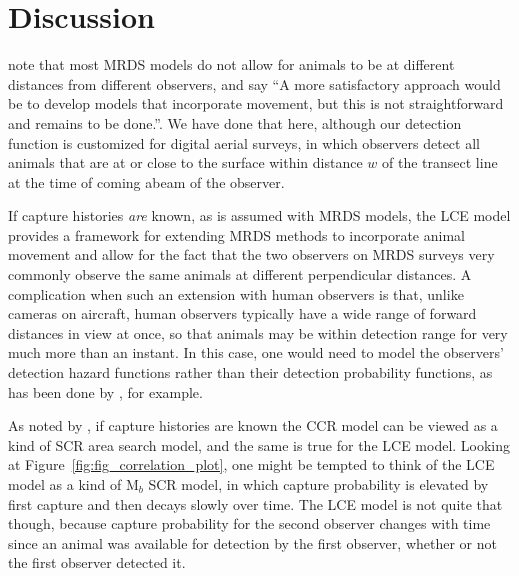 \documentclass[useAMS, usenatbib, referee]{biom}\usepackage[]{graphicx}\usepackage[]{color}
\begin{document}
\section{Discussion\label{sec:discussion}}


\cite{Burt+al:14} note that most MRDS models do not allow for animals to be at different distances from different observers, and say ``A more satisfactory approach would be to develop models that incorporate movement, but this is not straightforward and remains to be done.''. We have done that here, although our detection function is customized for digital aerial surveys, in which observers detect all animals that are at or close to the surface within distance $w$ of the transect line at the time of coming abeam of the observer.

If capture histories \textit{are} known, as is assumed with MRDS models, the LCE model provides a framework for extending MRDS methods to incorporate animal movement and allow for the fact that the two observers on MRDS surveys very commonly observe the same animals at different perpendicular distances. A complication when such an extension with human observers is that, unlike cameras on aircraft, human observers typically have a wide range of forward distances in view at once, so that animals may be within detection range for very much more than an instant. In this case, one would need to model the observers' detection hazard functions rather than their detection probability functions, as has been done by \cite{Langrock+al:13, Borchers+al:13, Borchers+Langrock:15, Borchers+Cox:16}, for example.

As noted by \cite{Stevenson+al:18}, if capture histories are known the CCR model can be viewed as a kind of SCR area search model, and the same is true for the LCE model. Looking at Figure~\ref{fig:fig_correlation_plot}, one might be tempted to think of the LCE model as a kind of M$_b$ SCR model, in which capture probability is elevated by first capture and then decays slowly over time. The LCE model is not quite that though, because capture probability for the second observer changes with time since an animal was available for detection by the first observer, whether or not the first observer detected it.

\end{document}
